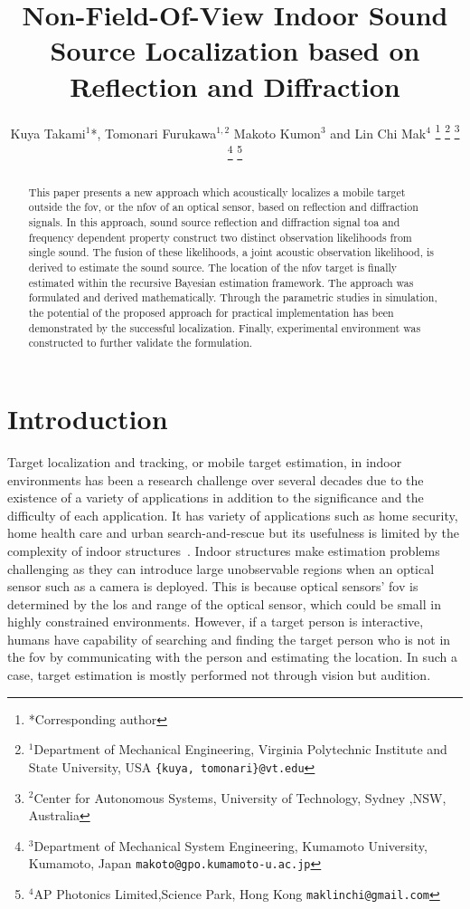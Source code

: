 \documentclass[letterpaper, 10 pt, conference]{ieeeconf}  %
\title{\LARGE \bf
Non-Field-Of-View Indoor Sound Source Localization based on Reflection and Diffraction
}
\author{Kuya Takami$^{1}$*, Tomonari Furukawa$^{1,2}$ Makoto Kumon$^{3}$ and Lin Chi Mak$^{4}$%
\thanks{*Corresponding author}%
\thanks{$^{1}$Department of Mechanical Engineering, Virginia Polytechnic Institute and State University, USA
        {\tt\small \{kuya, tomonari\}@vt.edu}}
\thanks{$^{2}$Center for Autonomous Systems, University of Technology, Sydney ,NSW, Australia
        {\tt\small}}      
\thanks{$^{3}$Department of Mechanical System Engineering, Kumamoto University, Kumamoto, Japan
        {\tt\small makoto@gpo.kumamoto-u.ac.jp}}
\thanks{$^{4}$AP Photonics Limited,Science Park, Hong Kong
        {\tt\small maklinchi@gmail.com}}
        }
\begin{document}
\maketitle
\thispagestyle{empty}
\pagestyle{empty}
\begin{abstract}
This paper presents a new approach which acoustically localizes a mobile target outside the \gls{fov}, or the \gls{nfov} of an optical sensor, based on reflection and diffraction signals. In this approach, sound source reflection and diffraction signal \gls{toa} and frequency dependent property construct two distinct observation likelihoods from single sound. The fusion of these likelihoods, a joint acoustic observation likelihood, is derived to estimate the sound source. The location of the \gls{nfov} target is finally estimated within the recursive Bayesian estimation framework. The approach was formulated and derived mathematically. Through the parametric studies in simulation, the potential of the proposed approach for practical implementation has been demonstrated by the successful localization. Finally, experimental environment was constructed to further validate the formulation.
\end{abstract}
\section{Introduction}
Target localization and tracking, or mobile target estimation, in indoor environments has been a research challenge over several decades due to the existence of a variety of applications in addition to the significance and the difficulty of each application. It has variety of applications such as home security, home health care and urban search-and-rescue but its usefulness is limited by the complexity of indoor structures~\cite{priyantha2005mobile,Khoury2009,argentieri2014survey}. Indoor structures make estimation problems challenging as they can introduce large unobservable regions when an optical sensor such as a camera is deployed.  This is because optical sensors' \acrfull{fov} is determined by the \gls{los} and range of the optical sensor, which could be small in highly constrained environments. However, if a target person is interactive, humans have capability of searching and finding the target person who is not in the \gls{fov} by communicating with the person and estimating the location. In such a case, target estimation is mostly performed not through vision but audition. 
\end{document}
